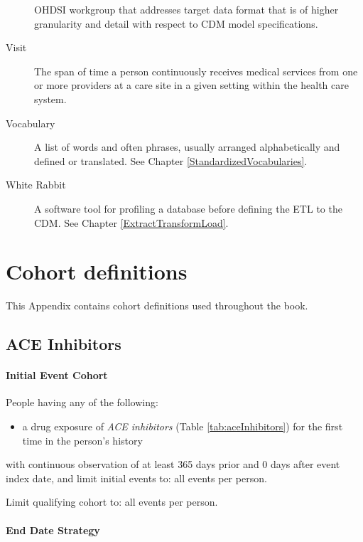 \documentclass[11pt]{book}
\providecommand{\tightlist}{%
  \setlength{\itemsep}{0pt}\setlength{\parskip}{0pt}}
\theoremstyle{definition}
\theoremstyle{definition}
\theoremstyle{definition}
\theoremstyle{remark}
\begin{document}
\begin{description}
OHDSI workgroup that addresses target data format that is of higher
granularity and detail with respect to CDM model specifications.
\item[Visit]
The span of time a person continuously receives medical services from
one or more providers at a care site in a given setting within the
health care system.
\item[Vocabulary]
A list of words and often phrases, usually arranged alphabetically and
defined or translated. See Chapter \ref{StandardizedVocabularies}.
\item[White Rabbit]
A software tool for profiling a database before defining the ETL to the
CDM. See Chapter \ref{ExtractTransformLoad}.
\end{description}

\chapter{Cohort definitions}\label{CohortDefinitions}

This Appendix contains cohort definitions used throughout the book.

\section{ACE Inhibitors}\label{AceInhibitors}

\subsubsection*{Initial Event Cohort}\label{initial-event-cohort}

People having any of the following:

\begin{itemize}
\tightlist
\item
  a drug exposure of \emph{ACE inhibitors} (Table
  \ref{tab:aceInhibitors}) for the first time in the person's history
\end{itemize}

with continuous observation of at least 365 days prior and 0 days after
event index date, and limit initial events to: all events per person.

Limit qualifying cohort to: all events per person.

\subsubsection*{End Date Strategy}\label{end-date-strategy}
\end{document}
